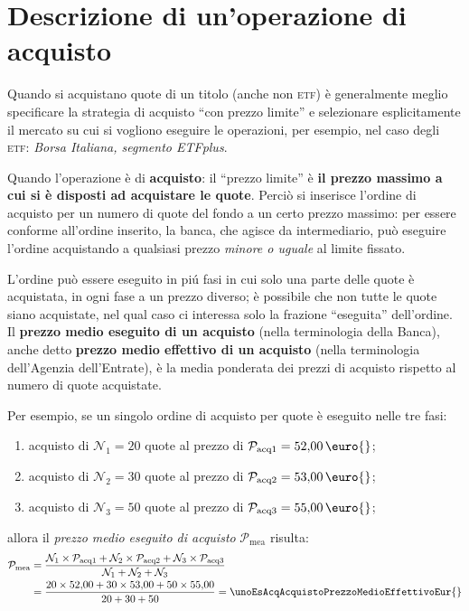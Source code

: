 \documentclass[12pt,a4paper]{article}
\newcommand{\Eur}[1]{\qty{#1}{\text{\euro{}}}}
\newcommand{\MediaPonderataTre}[6]{\frac{\num{#1} \times{} \num{#2} + \num{#3} \times{} \num{#4} + \num{#5} \times{} \num{#6}}{\num{#1} + \num{#3} + \num{#5}}}
\newcommand{\MediaPonderataTreSim}[6]{\frac{#1 \times{} #2 + #3 \times{} #4 + #5 \times{} #6}{#1 + #3 + #5}}
\newcommand{\Parentesi}[1]{(#1)}
\newcommand{\Virgolette}[1]{``#1''}
\newcommand{\Etf}[1]{\textsc{etf}}
\newcommand{\Nquo}[1]{\mathcal{N}_{#1}}
\newcommand{\Pacq}[1]{\mathcal{P}_{\mathrm{acq}#1}}
\newcommand{\Pmea}[1]{\mathcal{P}_{\mathrm{mea}#1}}
\begin{document}

\section{Descrizione di un'operazione di acquisto}




Quando  si  acquistano  quote di  un  titolo  \Parentesi{anche  non  \Etf{}} è  generalmente  meglio
specificare la strategia di acquisto \Virgolette{con  prezzo limite} e selezionare esplicitamente il
mercato su cui si  vogliono eseguire le operazioni, per esempio, nel  caso degli \Etf{}: \emph{Borsa
   Italiana, segmento ETFplus}.

Quando  l'operazione è  di  \textbf{acquisto}:  il \Virgolette{prezzo  limite}  è \textbf{il  prezzo
   massimo a cui  si è disposti ad acquistare  le quote}.  Perciò si inserisce  l'ordine di acquisto
per un numero di quote del fondo a un certo prezzo massimo: per essere conforme all'ordine inserito,
la  banca,  che agisce  da  intermediario,  può eseguire  l'ordine  acquistando  a qualsiasi  prezzo
\emph{minore o uguale} al limite fissato.

L'ordine può essere  eseguito in piú fasi  in cui solo una  parte delle quote è  acquistata, in ogni
fase a  un prezzo diverso; è  possibile che non  tutte le quote  siano acquistate, nel qual  caso ci
interessa solo la  frazione \Virgolette{eseguita} dell'ordine.  Il \textbf{prezzo  medio eseguito di
   un acquisto} (nella  terminologia della Banca), anche detto \textbf{prezzo  medio effettivo di un
   acquisto} (nella  terminologia dell'Agenzia  dell'Entrate), è  la media  ponderata dei  prezzi di
acquisto rispetto al numero di quote acquistate.

Per esempio,  se un singolo ordine  di acquisto per \unoEsAcqAcquistoNumeroQuote{}  quote è eseguito
nelle tre fasi:
\begin{enumerate}
\item acquisto di \(\Nquo{1} = \num{20}\) quote al prezzo di \(\Pacq{1} = \Eur{52,00}\);
\item acquisto di \(\Nquo{2} = \num{30}\) quote al prezzo di \(\Pacq{2} = \Eur{53,00}\);
\item acquisto di \(\Nquo{3} = \num{50}\) quote al prezzo di \(\Pacq{3} = \Eur{55,00}\);
\end{enumerate}
allora il \emph{prezzo medio eseguito di acquisto} \(\Pmea{}\) risulta:
\begin{align*}
  \Pmea{}
  &= \MediaPonderataTreSim{\Nquo{1}}{\Pacq{1}}{\Nquo{2}}{\Pacq{2}}{\Nquo{3}}{\Pacq{3}} \\
  &= \MediaPonderataTre{20}{52,00}{30}{53,00}{50}{55,00}
  = \unoEsAcqAcquistoPrezzoMedioEffettivoEur{}
\end{align*}
\end{document}
